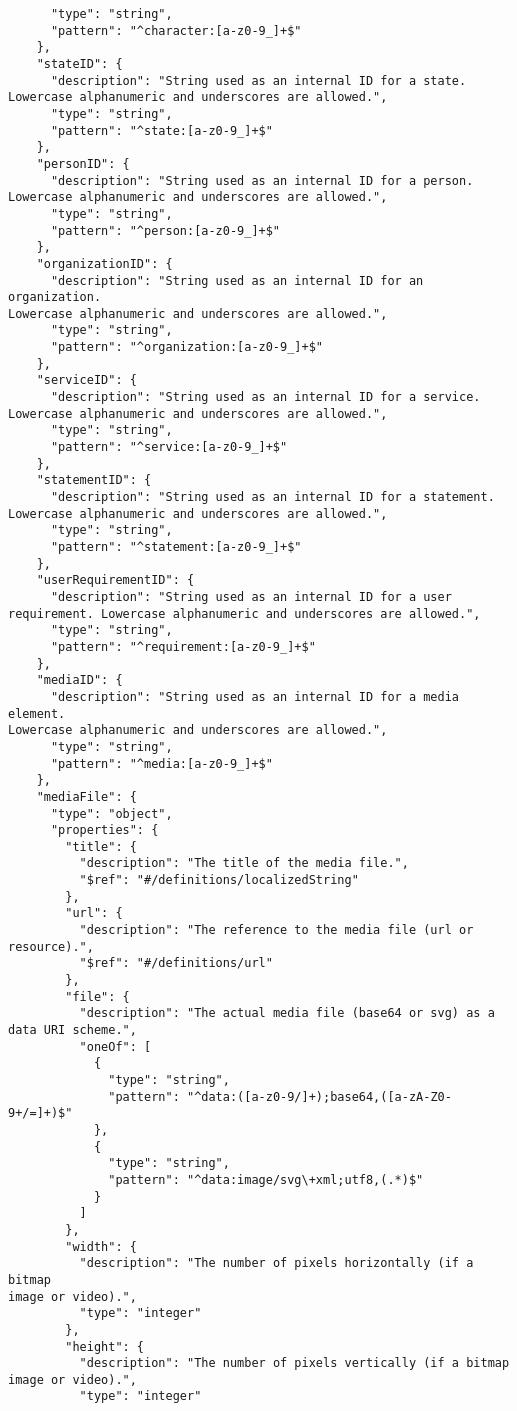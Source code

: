 \documentclass[10pt,letterpaper]{article}
\begin{document}
\begin{verbatim}
      "type": "string",
      "pattern": "^character:[a-z0-9_]+$"
    },
    "stateID": {
      "description": "String used as an internal ID for a state.
Lowercase alphanumeric and underscores are allowed.",
      "type": "string",
      "pattern": "^state:[a-z0-9_]+$"
    },
    "personID": {
      "description": "String used as an internal ID for a person.
Lowercase alphanumeric and underscores are allowed.",
      "type": "string",
      "pattern": "^person:[a-z0-9_]+$"
    },
    "organizationID": {
      "description": "String used as an internal ID for an organization.
Lowercase alphanumeric and underscores are allowed.",
      "type": "string",
      "pattern": "^organization:[a-z0-9_]+$"
    },
    "serviceID": {
      "description": "String used as an internal ID for a service.
Lowercase alphanumeric and underscores are allowed.",
      "type": "string",
      "pattern": "^service:[a-z0-9_]+$"
    },
    "statementID": {
      "description": "String used as an internal ID for a statement.
Lowercase alphanumeric and underscores are allowed.",
      "type": "string",
      "pattern": "^statement:[a-z0-9_]+$"
    },
    "userRequirementID": {
      "description": "String used as an internal ID for a user
requirement. Lowercase alphanumeric and underscores are allowed.",
      "type": "string",
      "pattern": "^requirement:[a-z0-9_]+$"
    },
    "mediaID": {
      "description": "String used as an internal ID for a media element.
Lowercase alphanumeric and underscores are allowed.",
      "type": "string",
      "pattern": "^media:[a-z0-9_]+$"
    },
    "mediaFile": {
      "type": "object",
      "properties": {
        "title": {
          "description": "The title of the media file.",
          "$ref": "#/definitions/localizedString"
        },
        "url": {
          "description": "The reference to the media file (url or
resource).",
          "$ref": "#/definitions/url"
        },
        "file": {
          "description": "The actual media file (base64 or svg) as a
data URI scheme.",
          "oneOf": [
            {
              "type": "string",
              "pattern": "^data:([a-z0-9/]+);base64,([a-zA-Z0-9+/=]+)$"
            },
            {
              "type": "string",
              "pattern": "^data:image/svg\+xml;utf8,(.*)$"
            }
          ]
        },
        "width": {
          "description": "The number of pixels horizontally (if a bitmap
image or video).",
          "type": "integer"
        },
        "height": {
          "description": "The number of pixels vertically (if a bitmap
image or video).",
          "type": "integer"

\end{verbatim}
\end{document}
